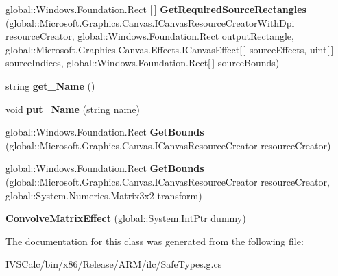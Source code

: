 \begin{DoxyCompactItemize}
\item 
\mbox{\label{class_microsoft_1_1_graphics_1_1_canvas_1_1_effects_1_1_convolve_matrix_effect_a27b0f7d9fc0466ee2d2d73a9d4aeda6e}} 
global\+::\+Windows.\+Foundation.\+Rect \mbox{[}$\,$\mbox{]} {\bfseries Get\+Required\+Source\+Rectangles} (global\+::\+Microsoft.\+Graphics.\+Canvas.\+I\+Canvas\+Resource\+Creator\+With\+Dpi resource\+Creator, global\+::\+Windows.\+Foundation.\+Rect output\+Rectangle, global\+::\+Microsoft.\+Graphics.\+Canvas.\+Effects.\+I\+Canvas\+Effect\mbox{[}$\,$\mbox{]} source\+Effects, uint\mbox{[}$\,$\mbox{]} source\+Indices, global\+::\+Windows.\+Foundation.\+Rect\mbox{[}$\,$\mbox{]} source\+Bounds)
\item 
\mbox{\label{class_microsoft_1_1_graphics_1_1_canvas_1_1_effects_1_1_convolve_matrix_effect_a1184f0aca4a0272ce95920ec83f0ba16}} 
string {\bfseries get\+\_\+\+Name} ()
\item 
\mbox{\label{class_microsoft_1_1_graphics_1_1_canvas_1_1_effects_1_1_convolve_matrix_effect_aeafe2515764ea10a75253b073810b457}} 
void {\bfseries put\+\_\+\+Name} (string name)
\item 
\mbox{\label{class_microsoft_1_1_graphics_1_1_canvas_1_1_effects_1_1_convolve_matrix_effect_a4447c7b37ba50f6a56fcab8c7162ef14}} 
global\+::\+Windows.\+Foundation.\+Rect {\bfseries Get\+Bounds} (global\+::\+Microsoft.\+Graphics.\+Canvas.\+I\+Canvas\+Resource\+Creator resource\+Creator)
\item 
\mbox{\label{class_microsoft_1_1_graphics_1_1_canvas_1_1_effects_1_1_convolve_matrix_effect_a9217d8a4ac41858e50073c043f56fb29}} 
global\+::\+Windows.\+Foundation.\+Rect {\bfseries Get\+Bounds} (global\+::\+Microsoft.\+Graphics.\+Canvas.\+I\+Canvas\+Resource\+Creator resource\+Creator, global\+::\+System.\+Numerics.\+Matrix3x2 transform)
\item 
\mbox{\label{class_microsoft_1_1_graphics_1_1_canvas_1_1_effects_1_1_convolve_matrix_effect_a5b7d51fb8ea576cdec1344b34f9bf8ff}} 
{\bfseries Convolve\+Matrix\+Effect} (global\+::\+System.\+Int\+Ptr dummy)
\end{DoxyCompactItemize}


The documentation for this class was generated from the following file\+:\begin{DoxyCompactItemize}
\item 
I\+V\+S\+Calc/bin/x86/\+Release/\+A\+R\+M/ilc/Safe\+Types.\+g.\+cs\end{DoxyCompactItemize}
